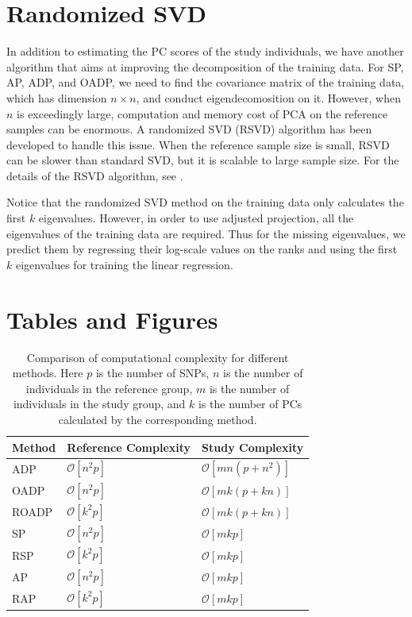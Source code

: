 \documentclass{article}
\newcommand{\bO}{\mathcal{O}}
\begin{document}
\newpage

\appendix

\section{Randomized SVD}\label{sec:randsvd}

In addition to estimating the PC scores of the study individuals,
we have another algorithm that aims at improving the decomposition of the
training data.
For SP, AP, ADP, and OADP, we need to find the covariance matrix of the training
data, which has dimension $n \times n$, and conduct eigendecomosition on it.
However, when $n$ is exceedingly large,
computation and memory cost of PCA on the reference samples can be enormous.
A randomized SVD (RSVD) algorithm has been developed to handle this issue.
When the reference sample size is small, RSVD can be slower than standard SVD,
but it is scalable to large sample size.
For the details of the RSVD algorithm, see \citet{halko2011finding}.

Notice that the randomized SVD method on the training data
only calculates the first $k$ eigenvalues.
However, in order to use adjusted projection,
all the eigenvalues of the training data are required.
Thus for the missing eigenvalues,
we predict them by regressing their log-scale values on the ranks
and using the first $k$ eigenvalues for training the linear regression.


\newpage





\newpage

\section{Tables and Figures}

\begin{table} 
  \centering
  \begin{tabular}{|l|l|l|}
    \hline
    Method & Reference Complexity & Study Complexity \\ 
    \hline
    ADP & $\bO[n^2 p]$ & $\bO[mn(p + n^2)]$ \\
    \hline
    OADP & $\bO[n^2 p]$ & $\bO[mk(p + k n)]$ \\
    \hline
    ROADP & $\bO[k^2 p]$ & $\bO[mk(p + k n)]$ \\
    \hline
    SP & $\bO[n^2p]$ & $\bO[mkp]$ \\
    \hline
    RSP & $\bO[k^2p]$ & $\bO[mkp]$ \\
    \hline
    AP & $\bO[n^2p]$ &  $\bO[mkp]$ \\
    \hline
    RAP & $\bO[k^2p]$ &  $\bO[mkp]$ \\
    \hline
  \end{tabular}
  \caption{
    Comparison of computational complexity for different methods.
    Here $p$ is the number of SNPs,
    $n$ is the number of individuals in the reference group,
    $m$ is the number of individuals in the  study group,
    and $k$ is the number of PCs calculated by the corresponding method.
  }
  \label{tbl:cplx}
\end{table}
\end{document}
